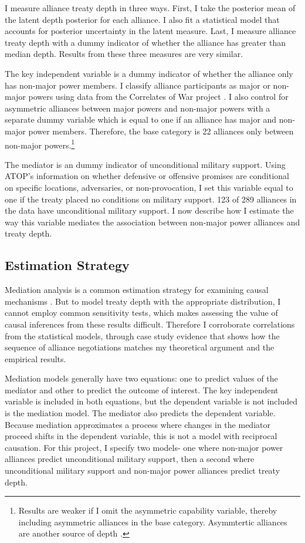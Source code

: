 \documentclass[12pt]{article}
\begin{document}
I measure alliance treaty depth in three ways.
First, I take the posterior mean of the latent depth posterior for each alliance. 
I also fit a statistical model that accounts for posterior uncertainty in the latent measure. 
Last, I measure alliance treaty depth with a dummy indicator of whether the alliance has greater than median depth. 
Results from these three measures are very similar. 


The key independent variable is a dummy indicator of whether the alliance only has non-major power members. 
I classify alliance participants as major or non-major powers using data from the Correlates of War project \citep{SingerCINC1988}.
I also control for asymmetric alliances between major powers and non-major powers with a separate dummy variable which is equal to one if an alliance has major and non-major power members. 
Therefore, the base category is 22 alliances only between non-major powers.\footnote{Results are weaker if I omit the asymmetric capability variable, thereby including asymmetric alliances in the base category. Asymmtertic alliances are another source of depth \citep{Mattes2012}.}  


The mediator is an dummy indicator of unconditional military support. 
Using ATOP's information on whether defensive or offensive promises are conditional on specific locations, adversaries, or non-provocation, I set this variable equal to one if the treaty placed no conditions on military support.
123 of 289 alliances in the data have unconditional military support. 
I now describe how I estimate the way this variable mediates the association between non-major power alliances and treaty depth. 


\subsection{Estimation Strategy}

Mediation analysis is a common estimation strategy for examining causal mechanisms \citep{Imaietal2011}. 
But to model treaty depth with the appropriate distribution, I cannot employ common sensitivity tests, which makes assessing the value of causal inferences from these results difficult. 
Therefore I corroborate correlations from the statistical models, through case study evidence that shows how the sequence of alliance negotiations matches my theoretical argument and the empirical results. 


Mediation models generally have two equations: one to predict values of the mediator and other to predict the outcome of interest. 
The key independent variable is included in both equations, but the dependent variable is not included is the mediation model. 
The mediator also predicts the dependent variable. 
Because mediation approximates a process where changes in the mediator proceed shifts in the dependent variable, this is not a model with reciprocal causation. 
For this project, I specify two models- one where non-major power alliances predict unconditional military support, then a second where unconditional military support and non-major power alliances predict treaty depth. 
\end{document}
